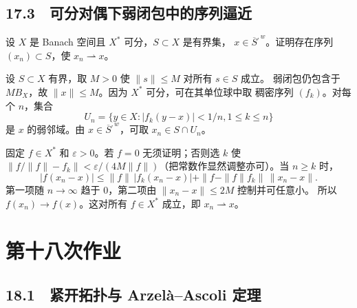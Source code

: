 \subsection*{17.3　可分对偶下弱闭包中的序列逼近}

\begin{problem}
设 $X$ 是 Banach 空间且 $X^*$ 可分，$S\subset X$ 是有界集，
$x\in\overline S^{,w}$。证明存在序列 $(x_n)\subset S$，使
$x_n\rightharpoonup x$。
\end{problem}

设 $S\subset X$ 有界，取 $M>0$ 使 $\|s\|\le M$ 对所有 $s\in S$ 成立。
弱闭包仍包含于 $MB_X$，故 $\|x\|\le M$。因为 $X^*$ 可分，可在其单位球中取
稠密序列 $(f_k)$。对每个 $n$，集合
\[
 U_n=\{y\in X:|f_k(y-x)|<1/n, 1\le k\le n\}
\]
是 $x$ 的弱邻域。由 $x\in\overline S^{,w}$，可取 $x_n\in S\cap U_n$。

固定 $f\in X^*$ 和 $\varepsilon>0$。若 $f=0$ 无须证明；否则选 $k$ 使
$\|f/\|f\|-f_k\|<\varepsilon/(4M\|f\|)$（把常数作显然调整亦可）。当
$n\ge k$ 时，
\[
 |f(x_n-x)|
 \le \|f\|\,|f_k(x_n-x)|
 +\|f-\|f\|f_k\|\,\|x_n-x\|.
\]
第一项随 $n\to\infty$ 趋于 $0$，第二项由 $\|x_n-x\|\le2M$ 控制并可任意小。
所以 $f(x_n)\to f(x)$。这对所有 $f\in X^*$ 成立，即 $x_n\rightharpoonup x$。

\section{第十八次作业}

\subsection*{18.1　紧开拓扑与 Arzel\`a--Ascoli 定理}

